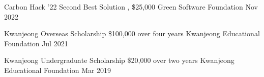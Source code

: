 



\begin{cvhonors}

  \cvhonor
    {Carbon Hack '22 Second Best Solution} %
    {\href{https://taikai.network/gsf/hackathons/carbonhack22/projects/cl95qxjpa70555701uhg96r0ek6/idea}{}, \$25,000} %
    {Green Software Foundation} %
    {Nov 2022} %

  \cvhonor
    {Kwanjeong Overseas Scholarship} %
    {\$100,000 over four years} %
    {Kwanjeong Educational Foundation} %
    {Jul 2021} %

  \cvhonor
    {Kwanjeong Undergraduate Scholarship} %
    {\$20,000 over two years} %
    {Kwanjeong Educational Foundation} %
    {Mar 2019} %




\end{cvhonors}


